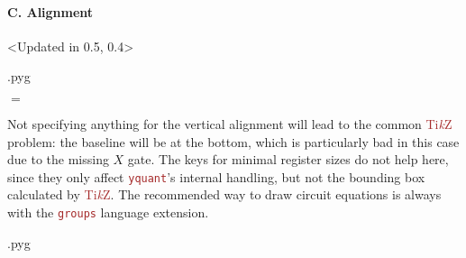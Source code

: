 \documentclass{scrartcl}
\makeatletter
\newenvironment{codeexample}{%
   \VerbatimEnvironment%
   \let\FVB@VerbatimOut\minted@FVB@VerbatimOut
   \let\FVE@VerbatimOut\minted@FVE@VerbatimOut
   \minted@configlang{tex}%
   \minted@fvset
   \begin{VerbatimOut}[codes={\catcode`\^^I=12},firstline,lastline]{\minted@jobname.pyg}%
}{
   \end{VerbatimOut}%
   \minted@langlinenoson%
   \savebox\codeexamplebox{ \minted@jobname.pyg}%
   \ifdim\wd\codeexamplebox>\dimexpr.5\linewidth-3mm\relax%
      \wd\codeexamplebox=.5\linewidth%
   \else%
      \wd\codeexamplebox=\dimexpr\wd\codeexamplebox+3mm\relax%
   \fi%
   \noindent\begin{minipage}{\wd\codeexamplebox}%
      \centering%
      \usebox\codeexamplebox%
   \end{minipage}%
   \begin{minipage}{\dimexpr\linewidth-\wd\codeexamplebox\relax}%
      \minted@pygmentize{\minted@lang}%
   \end{minipage}%
   \minted@langlinenosoff%
   \par%
}
\def\TikZ{\textcolor{brown}{Ti\textit kZ}}
\def\pkg#1{\textcolor{brown}{\texttt{#1}}}
\def\Yquant{\pkg{yquant}}
\makeatother
\begin{document}
            \paragraph{C. Alignment}\leavevmode
               \begin{example}<Updated in 0.5, 0.4>
                  \begin{codeexample}
$=$
                  \end{codeexample}
                  Not specifying anything for the vertical alignment will lead to the common \TikZ{} problem: the baseline will be at the bottom, which is particularly bad in this case due to the missing $X$ gate.
                  The keys for minimal register sizes do not help here, since they only affect \Yquant's internal handling, but not the bounding box calculated by \TikZ.
                  The recommended way to draw circuit equations is always with the \pkg{groups} language extension.

                  \begin{codeexample}
\begin{yquantgroup}
   \equals
\end{yquantgroup}
                  \end{codeexample}
               \end{example}
\end{document}
